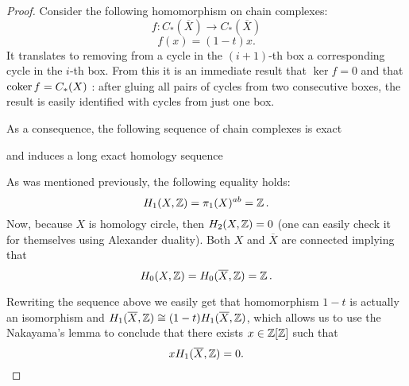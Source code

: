 \begin{proof}
  Consider the following homomorphism on chain complexes:
  $$f:C_*(\overline{X})\to C_*(\overline{X})$$
  $$f(x)=(1-t)x.$$
  It translates to removing from a cycle in the $(i+1)$-th box a corresponding cycle in the $i$-th box. From this it is an immediate result that $\ker f=0$ and that $\operatorname{coker} f=C_*(X)$ : after gluing all pairs of cycles from two consecutive boxes, the result is easily identified with cycles from just one box.

  As a consequence, the following sequence of chain complexes is exact
  \begin{center}
  \end{center}
  and induces a long exact homology sequence
  \begin{center}
  \end{center}
  As was mentioned previously, the following equality holds:
  $$H_1(X, \operatorname{\mathbb{Z}})=\pi_1(X)^{ab}=\operatorname{\mathbb{Z}}.$$
  Now, because $X$ is homology circle, then $H_2(X, \operatorname{\mathbb{Z}})=0$ (one can easily check it for themselves using Alexander duality). Both $X$ and $\overline{X}$ are connected implying that 
  $$H_0(X, \operatorname{\mathbb{Z}})=H_0(\overline{X}, \operatorname{\mathbb{Z}})=\operatorname{\mathbb{Z}}.$$
  \begin{center}
  \end{center}
  Rewriting the sequence above we easily get that homomorphism $1-t$ is actually an isomorphism and $H_1(\overline{X}, \operatorname{\mathbb{Z}})\cong (1-t) H_1(\overline{X}, \operatorname{\mathbb{Z}})$, which allows us to use the Nakayama's lemma \cite[Proposition~2.6]{atiyah} to conclude that there exists $x\in\operatorname{\mathbb{Z}}[\operatorname{\mathbb{Z}}]$ such that
  $$xH_1(\overline{X}, \operatorname{\mathbb{Z}})=0.$$
\end{proof}
